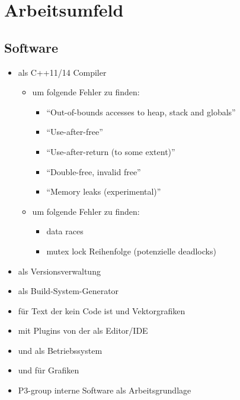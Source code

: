 \section{Arbeitsumfeld}
\label{sec:arbeitsumfeld}

  \subsection{Software}
  \label{ssec:software}
    \begin{itemize}
      \item {} als C++11/14 Compiler
        \begin{itemize}
          \item {} um folgende Fehler zu finden:
            \begin{itemize}
              \item ``Out-of-bounds accesses to heap, stack and globals''
              \item ``Use-after-free''
              \item ``Use-after-return (to some extent)''
              \item ``Double-free, invalid free''
              \item ``Memory leaks (experimental)''
            \end{itemize}
          \item {} um folgende Fehler zu finden:
            \begin{itemize}
              \item data races
              \item mutex lock Reihenfolge (potenzielle deadlocks)
             \end{itemize}
        \end{itemize}
      \item {} als Versionsverwaltung
      \item {} als Build-System-Generator
      \item {} für Text der kein Code ist und Vektorgrafiken
      \item {} mit Plugins von der  als Editor/IDE
      \item {} und  als Betriebssystem
      \item {} und  für Grafiken
      \item P3-group interne Software als Arbeitsgrundlage
    \end{itemize}

